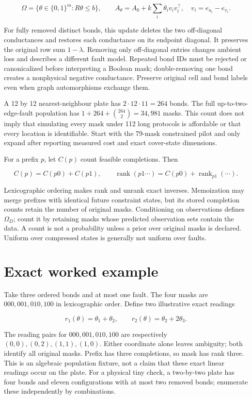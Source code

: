 \documentclass[
  11pt,
  a4paper,
]{report}
\let\nxtexttt\texttt
\renewcommand{\texttt}[1]{\nxtexttt{\seqsplit{#1}}}
\begin{document}
\[
\Omega=\{\theta\in\{0,1\}^m:R\theta\le b\},\qquad
A_\theta=A_0+k\sum_i\theta_i v_iv_i^\top,
\quad v_i=e_{u_i}-e_{v_i}.
\]

For fully removed distinct bonds, this update deletes the two
off-diagonal conductances and restores each conductance on its endpoint
diagonal. It preserves the original row sum \(1-\lambda\). Removing only
off-diagonal entries changes ambient loss and describes a different
fault model. Repeated bond IDs must be rejected or canonicalized before
interpreting a Boolean mask; double-removing one bond creates a
nonphysical negative conductance. Preserve original cell and bond labels
even when graph automorphisms exchange them.

A 12 by 12 nearest-neighbour plate has \(2\cdot12\cdot11=264\) bonds.
The full up-to-two-edge-fault population has
\(1+264+\binom{264}{2}=34,981\) masks. This count does not imply that
simulating every mask under 112 long protocols is affordable or that
every location is identifiable. Start with the 79-mask constrained pilot
and only expand after reporting measured cost and exact cover-state
dimensions.

For a prefix \(p\), let \(C(p)\) count feasible completions. Then

\[
C(p)=C(p0)+C(p1),\qquad
\operatorname{rank}(p1\cdots)=C(p0)+\operatorname{rank}_{p1}(\cdots).
\]

Lexicographic ordering makes rank and unrank exact inverses. Memoization
may merge prefixes with identical future constraint states, but its
stored completion counts retain the number of original masks.
Conditioning on observations defines \(\Omega_D\); count it by retaining
masks whose predicted observation sets contain the data. A count is not
a probability unless a prior over original masks is declared. Uniform
over compressed states is generally not uniform over faults.

\hypertarget{exact-worked-example-2}{%
\section{Exact worked example}\label{exact-worked-example-2}}

Take three ordered bonds and at most one fault. The four masks are
\(000,001,010,100\) in lexicographic order. Define two illustrative
exact readings

\[
r_1(\theta)=\theta_1+\theta_2,
\qquad r_2(\theta)=\theta_2+2\theta_3.
\]

The reading pairs for \(000,001,010,100\) are respectively
\((0,0),(0,2),(1,1),(1,0)\). Either coordinate alone leaves ambiguity;
both identify all original masks. Prefix \texttt{0} has three
completions, so mask \texttt{100} has rank three. This is an algebraic
population fixture, not a claim that these exact linear readings occur
on the plate. For a physical tiny check, a two-by-two plate has four
bonds and eleven configurations with at most two removed bonds;
enumerate these independently by combinations.
\end{document}

